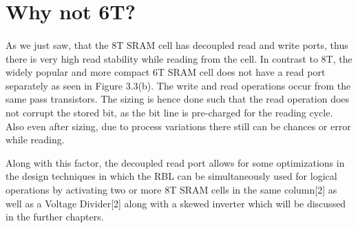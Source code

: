 \section{Why not 6T?}
\paragraph{}

As we just saw, that the 8T SRAM cell has decoupled read and write ports, thus there is very high read stability while reading from the cell. In contrast to 8T, the widely popular and more compact 6T SRAM cell does not have a read port separately as seen in Figure 3.3(b). The write and read operations occur from the same pass transistors. The sizing is hence done such that the read operation does not corrupt the stored bit, as the bit line is pre-charged for the reading cycle. Also even after sizing, due to process variations there still can be chances or error while reading. 

Along with this factor, the decoupled read port allows for some optimizations in the design techniques in which the RBL can be simultaneously used for logical operations by activating two or more 8T SRAM cells in the same column[2] as well as a Voltage Divider[2] along with a skewed inverter which will be discussed in the further chapters.

